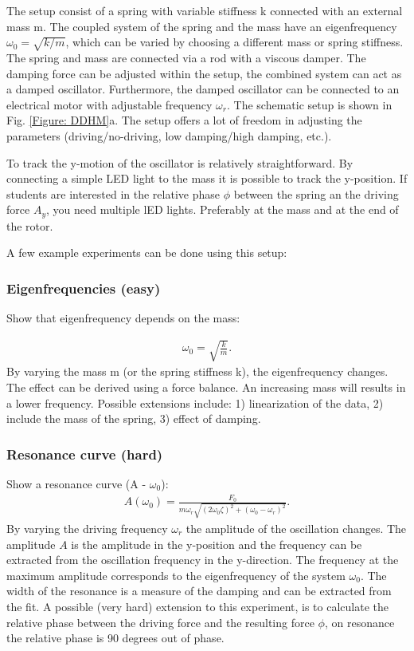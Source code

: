 \documentclass{article}
\begin{document}
The setup consist of a spring with variable stiffness k connected with an external mass m. The coupled system of the spring and the mass have an eigenfrequency $\omega_0 = \sqrt{k/m}$, which can be varied by choosing a different mass or spring stiffness. The spring and mass are connected via a rod with a viscous damper. The damping force can be adjusted within the setup, the combined system can act as a damped oscillator. Furthermore, the damped oscillator can be connected to an electrical motor with adjustable frequency $\omega_r$. The schematic setup is shown in Fig. \ref{Figure: DDHM}a. The setup offers a lot of freedom in adjusting the parameters (driving/no-driving, low damping/high damping, etc.).

To track the y-motion of the oscillator is relatively straightforward. By connecting a simple LED light to the mass it is possible to track the y-position. If students are interested in the relative phase $\phi$ between the spring an the driving force $A_y$, you need multiple lED lights. Preferably at the mass and at the end of the rotor.

A few example experiments can be done using this setup:

\subsubsection{Eigenfrequencies (easy)}    
Show that eigenfrequency depends on the mass:

\begin{align}
    \omega_0 = \sqrt{\frac{k}{m}}.
\end{align}
By varying the mass m (or the spring stiffness k), the eigenfrequency changes. The effect can be derived using a force balance. An increasing mass will results in a lower frequency. Possible extensions include: 1) linearization of the data, 2) include the mass of the spring, 3) effect of damping.

\subsubsection{Resonance curve (hard)}    
Show a resonance curve (A - $\omega_0$):
\begin{align}
    A(\omega_0) = \frac{F_0}{m\omega_r \sqrt{(2\omega_0\zeta)^2+(\omega_0-\omega_r)^2}}.
\end{align}
By varying the driving frequency $\omega_r$ the amplitude of the oscillation changes. The amplitude $A$ is the amplitude in the y-position and the frequency can be extracted from the oscillation frequency in the y-direction. The frequency at the maximum amplitude corresponds to the eigenfrequency of the system $\omega_0$. The width of the resonance is a measure of the damping and can be extracted from the fit. A possible (very hard) extension to this experiment, is to calculate the relative phase between the driving force and the resulting force $\phi$, on resonance the relative phase is 90 degrees out of phase. 
\end{document}
